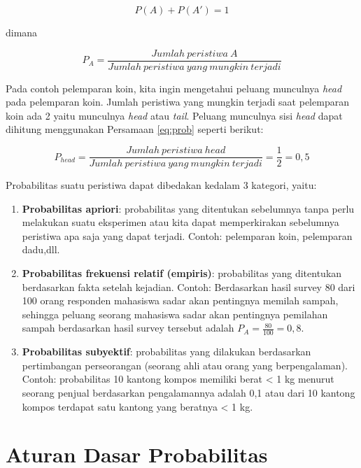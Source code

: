 \documentclass[]{book}
\providecommand{\tightlist}{%
  \setlength{\itemsep}{0pt}\setlength{\parskip}{0pt}}
\begin{document}
\begin{equation}
   P\left(A\right)+P\left(A'\right)=1
  \label{eq:prob}
\end{equation}

dimana

\begin{equation}
   P_A=\frac{Jumlah\ peristiwa\ A}{Jumlah\ peristiwa\ yang\ mungkin\ terjadi}
  \label{eq:prob2}
\end{equation}

Pada contoh pelemparan koin, kita ingin mengetahui peluang munculnya
\emph{head} pada pelemparan koin. Jumlah peristiwa yang mungkin terjadi
saat pelemparan koin ada 2 yaitu munculnya \emph{head} atau \emph{tail}.
Peluang munculnya sisi \emph{head} dapat dihitung menggunakan Persamaan
\eqref{eq:prob} seperti berikut:

\[
P_{head}=\frac{Jumlah\ peristiwa\ head}{Jumlah\ peristiwa\ yang\ mungkin\ terjadi}=\frac{1}{2}=0,5
\]

Probabilitas suatu peristiwa dapat dibedakan kedalam 3 kategori, yaitu:

\begin{enumerate}
\def\labelenumi{\arabic{enumi}.}
\tightlist
\item
  \textbf{Probabilitas apriori}: probabilitas yang ditentukan sebelumnya
  tanpa perlu melakukan suatu eksperimen atau kita dapat memperkirakan
  sebelumnya peristiwa apa saja yang dapat terjadi. Contoh: pelemparan
  koin, pelemparan dadu,dll.
\item
  \textbf{Probabilitas frekuensi relatif (empiris)}: probabilitas yang
  ditentukan berdasarkan fakta setelah kejadian. Contoh: Berdasarkan
  hasil survey 80 dari 100 orang responden mahasiswa sadar akan
  pentingnya memilah sampah, sehingga peluang seorang mahasiswa sadar
  akan pentingnya pemilahan sampah berdasarkan hasil survey tersebut
  adalah \(P_A=\frac{80}{100}=0,8\).
\item
  \textbf{Probabilitas subyektif}: probabilitas yang dilakukan
  berdasarkan pertimbangan perseorangan (seorang ahli atau orang yang
  berpengalaman). Contoh: probabilitas 10 kantong kompos memiliki berat
  \textless{} 1 kg menurut seorang penjual berdasarkan pengalamannya
  adalah 0,1 atau dari 10 kantong kompos terdapat satu kantong yang
  beratnya \textless{} 1 kg.
\end{enumerate}

\section{Aturan Dasar Probabilitas}\label{aturan-dasar-probabilitas}
\end{document}
